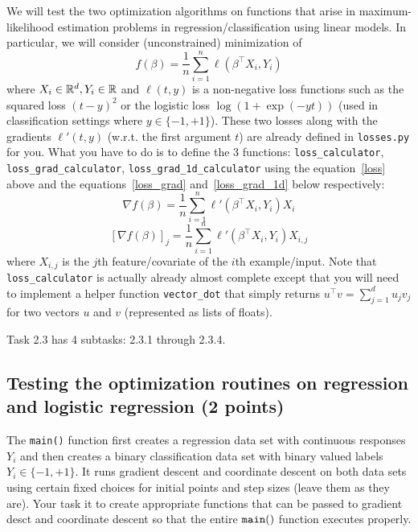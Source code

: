 \documentclass{article}
\begin{document}
We will test the two optimization algorithms on functions that arise in maximum-likelihood estimation problems in regression/classification using linear models.
In particular, we will consider (unconstrained) minimization of
\begin{equation}\label{loss}
f(\beta) = \frac{1}{n} \sum_{i=1}^n \ell(\beta^\top X_i, Y_i)
\end{equation}
where $X_i \in \mathbb{R}^d, Y_i \in \mathbb{R}$ and $\ell(t, y)$ is a non-negative loss functions such as the squared loss $(t-y)^2$ or the logistic loss
$\log(1+\exp(-yt))$ (used in classification settings where $y \in \{-1,+1\}$). These two losses along with the gradients $\ell'(t,y)$ (w.r.t. the first argument $t$)
are already defined in {\tt losses.py} for you. What you have to do is to define the 3 functions: {\tt loss\_calculator}, {\tt loss\_grad\_calculator},
{\tt loss\_grad\_1d\_calculator} using the equation~\eqref{loss} above and the equations~\eqref{loss_grad} and~\eqref{loss_grad_1d} below respectively:
\begin{equation}\label{loss_grad}
\nabla f(\beta) = \frac{1}{n} \sum_{i=1}^n \ell'(\beta^\top X_i, Y_i) X_i
\end{equation}
\begin{equation}\label{loss_grad_1d}
[\nabla f(\beta)]_j = \frac{1}{n} \sum_{i=1}^n \ell'(\beta^\top X_i, Y_i) X_{i,j}
\end{equation}
where $X_{i,j}$ is the $j$th feature/covariate of the $i$th example/input. Note that {\tt loss\_calculator} is actually already almost complete except that you will
need to implement a helper function {\tt vector\_dot} that simply returns
$u^\top v = \sum_{j=1}^d u_jv_j$ for two vectors $u$ and $v$ (represented as lists of floats).

Task 2.3 has 4 subtasks: 2.3.1 through 2.3.4.

\subsection{Testing the optimization routines on regression and logistic regression (2 points)}

The {\tt main()} function first creates a regression data set with continuous responses $Y_i$ and then creates a binary classification data set with
binary valued labels $Y_i \in \{-1,+1\}$. It runs gradient descent and coordinate descent on both data sets using certain fixed choices for initial
points and step sizes (leave them as they are). Your task it to create appropriate functions that can be passed to gradient desct and coordinate
descent so that the entire ${\tt main()}$ function executes properly.
\end{document}
